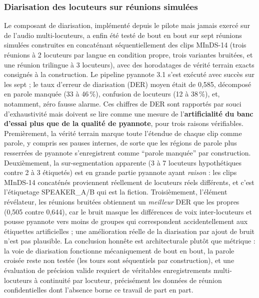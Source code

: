 \documentclass[12pt]{report}
\begin{document}
\subsubsection{Diarisation des locuteurs sur réunions simulées}
Le composant de diarisation, implémenté depuis le pilote mais jamais exercé sur de l'audio multi-locuteurs, a enfin été testé de bout en bout sur sept réunions simulées construites en concaténant séquentiellement des clips MInDS-14 (trois réunions à 2 locuteurs par langue en condition propre, trois variantes bruitées, et une réunion trilingue à 3 locuteurs), avec des horodatages de vérité terrain exacts consignés à la construction. Le pipeline pyannote 3.1 s'est exécuté avec succès sur les sept ; le taux d'erreur de diarisation (DER) moyen était de 0,585, décomposé en parole manquée (33 à 46\,\%), confusion de locuteurs (12 à 38\,\%), et, notamment, zéro fausse alarme.
Ces chiffres de DER sont rapportés par souci d'exhaustivité mais doivent se lire comme une mesure de l'\textbf{artificialité du banc d'essai plus que de la qualité de pyannote}, pour trois raisons vérifiables. Premièrement, la vérité terrain marque toute l'étendue de chaque clip comme parole, y compris ses pauses internes, de sorte que les régions de parole plus resserrées de pyannote s'enregistrent comme \enquote{parole manquée} par construction. Deuxièmement, la sur-segmentation apparente (3 à 7 locuteurs hypothétiques contre 2 à 3 étiquetés) est en grande partie pyannote ayant \emph{raison} : les clips MInDS-14 concaténés proviennent réellement de locuteurs réels différents, et c'est l'étiquetage SPEAKER\_A/B qui est la fiction. Troisièmement, l'élément révélateur, les réunions bruitées obtiennent un \emph{meilleur} DER que les propres (0,505 contre 0,644), car le bruit masque les différences de voix inter-locuteurs et pousse pyannote vers moins de groupes qui correspondent accidentellement aux étiquettes artificielles ; une amélioration réelle de la diarisation par ajout de bruit n'est pas plausible. La conclusion honnête est architecturale plutôt que métrique : la voie de diarisation fonctionne mécaniquement de bout en bout, la parole croisée reste non testée (les tours sont séquentiels par construction), et une évaluation de précision valide requiert de véritables enregistrements multi-locuteurs à continuité par locuteur, précisément les données de réunion confidentielles dont l'absence borne ce travail de part en part.
\end{document}
